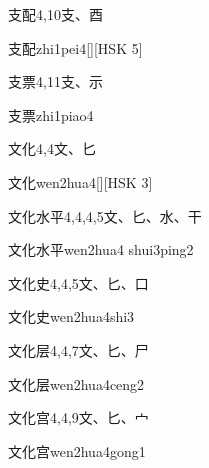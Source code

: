 \begin{entry}{支配}{4,10}{⽀、⾣}
  \begin{phonetics}{支配}{zhi1pei4}[][HSK 5]
  \end{phonetics}
\end{entry}

\begin{entry}{支票}{4,11}{⽀、⽰}
  \begin{phonetics}{支票}{zhi1piao4}
  \end{phonetics}
\end{entry}

\begin{entry}{文化}{4,4}{⽂、⼔}
  \begin{phonetics}{文化}{wen2hua4}[][HSK 3]
  \end{phonetics}
\end{entry}

\begin{entry}{文化水平}{4,4,4,5}{⽂、⼔、⽔、⼲}
  \begin{phonetics}{文化水平}{wen2hua4 shui3ping2}
  \end{phonetics}
\end{entry}

\begin{entry}{文化史}{4,4,5}{⽂、⼔、⼝}
  \begin{phonetics}{文化史}{wen2hua4shi3}
  \end{phonetics}
\end{entry}

\begin{entry}{文化层}{4,4,7}{⽂、⼔、⼫}
  \begin{phonetics}{文化层}{wen2hua4ceng2}
  \end{phonetics}
\end{entry}

\begin{entry}{文化宫}{4,4,9}{⽂、⼔、⼧}
  \begin{phonetics}{文化宫}{wen2hua4gong1}
  \end{phonetics}
\end{entry}

